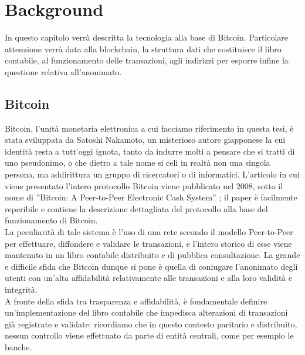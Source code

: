\chapter{Background}
In questo capitolo verrà descritta la tecnologia alla base di Bitcoin. Particolare attenzione verrà data alla blockchain, la struttura dati che costituisce il libro contabile, al funzionamento delle transazioni, agli indirizzi per esporre infine la questione relativa all'anonimato. 
\section{Bitcoin}
Bitcoin, l’unità monetaria elettronica a cui facciamo riferimento in questa tesi, è stata sviluppata da Satoshi Nakamoto, un misterioso autore giapponese la cui identità resta a tutt'oggi ignota, tanto da indurre molti a pensare che si tratti di uno pseudonimo, o che dietro a tale nome si celi in realtà non una singola persona, ma addirittura un gruppo di ricercatori o di informatici. L’articolo in cui viene presentato l’intero protocollo Bitcoin viene pubblicato nel 2008, sotto il nome di ”Bitcoin: A Peer-to-Peer Electronic Cash System” \cite{nakamoto2009bitcoin}; il paper è facilmente reperibile e contiene la descrizione dettagliata del protocollo alla base del funzionamento di Bitcoin.\\La peculiarità di tale sistema è l’uso di una rete secondo il modello Peer-to-Peer per effettuare, diffondere e validare le transazioni, e l’intero storico di esse viene mantenuto in un libro contabile distribuito e di pubblica consultazione. La grande e difficile sfida che Bitcoin dunque si pone è quella di coniugare l’anonimato degli utenti con un’alta affidabilità relativamente alle transazioni e alla loro validità e integrità.\\A fronte della sfida tra trasparenza e affidabilità, è fondamentale definire un’implementazione del libro contabile che impedisca alterazioni di transazioni già registrate e validate: ricordiamo che in questo contesto paritario e distribuito, nessun controllo viene effettuato da parte di entità centrali, come per esempio le banche.\\
